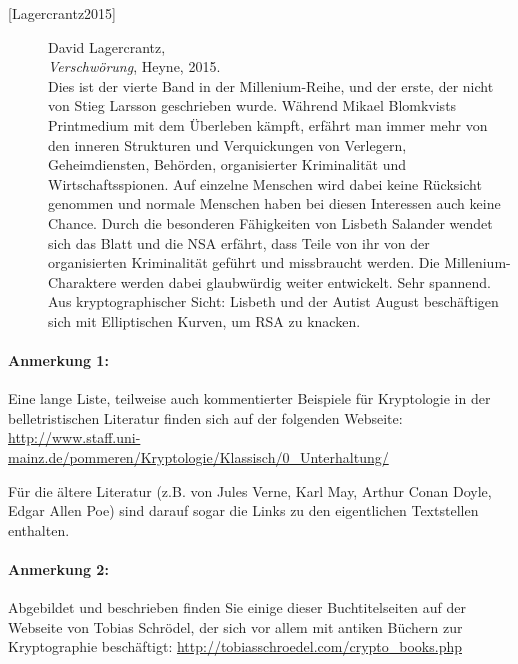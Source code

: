 \begin{description}
\item[\textrm{[Lagercrantz2015]}] 
    David Lagercrantz, \\
    {\em Verschwörung}, Heyne, 2015. \\
    Dies ist der vierte Band in der Millenium-Reihe, und der erste, der nicht von
    Stieg Larsson geschrieben wurde. Während Mikael Blomkvists Printmedium mit
    dem Überleben kämpft, erfährt man immer mehr von den inneren Strukturen und
    Verquickungen von Verlegern, Geheimdiensten, Behörden, organisierter Kriminalität
    und Wirtschaftsspionen.
    Auf einzelne Menschen wird dabei keine Rücksicht genommen und normale Menschen
    haben bei diesen Interessen auch keine Chance. Durch die besonderen Fähigkeiten von
    Lisbeth Salander wendet sich das Blatt und die NSA erfährt, dass Teile von ihr
    von der organisierten Kriminalität geführt und missbraucht werden. Die Millenium-Charaktere
    werden dabei glaubwürdig weiter entwickelt. Sehr spannend.\\
    Aus kryptographischer Sicht: Lisbeth und der Autist August beschäftigen sich
    mit Elliptischen Kurven, um RSA zu knacken.\\



\end{description}




\paragraph*{Anmerkung 1:}
Eine lange Liste, teilweise auch kommentierter Beispiele für Kryptologie in der
belletristischen Literatur finden sich auf der folgenden Webseite:
    \url{http://www.staff.uni-mainz.de/pommeren/Kryptologie/Klassisch/0_Unterhaltung/}

Für die ältere Literatur (z.B. von Jules Verne, Karl May, Arthur Conan
Doyle, Edgar Allen Poe) sind darauf sogar die Links zu den eigentlichen
Textstellen enthalten.


\paragraph*{Anmerkung 2:}
Abgebildet und beschrieben finden Sie einige dieser Buchtitelseiten
auf der Webseite von Tobias Schrödel, der sich vor allem mit
antiken Büchern zur Kryptographie beschäftigt:
   \url{http://tobiasschroedel.com/crypto_books.php}


